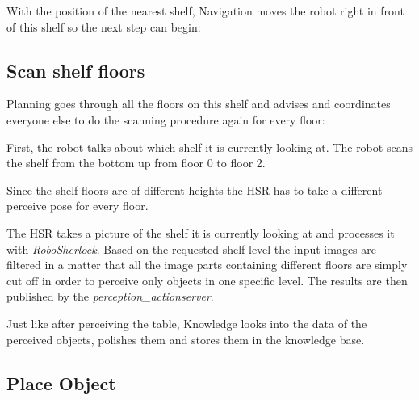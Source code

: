\documentclass[main.tex]{subfiles}
\begin{document}
	\begin{navigation}
	With the position of the nearest shelf, Navigation moves the robot right in front of this shelf so the next step can begin:
	\end{navigation}
	
	\subsection{Scan shelf floors}
	
	\begin{planning}
	Planning goes through all the floors on this shelf and advises and coordinates everyone else to do the scanning procedure again for every floor:
	\end{planning}
	\begin{nlp}
	First, the robot talks about which shelf it is currently looking at. The robot scans the shelf from the bottom up from floor 0 to floor 2.\end{nlp}
	
	\begin{manipulation}
	Since the shelf floors are of different heights the HSR has to take a different perceive pose for every floor.
	\end{manipulation}
	
	\begin{perception}
	The HSR takes a picture of the shelf it is currently looking at and processes it with \textit{RoboSherlock}. Based on the requested shelf level the input images are filtered in a matter that all the image parts containing different floors are simply cut off in order to perceive only objects in one specific level. The results are then published by the \textit{perception\_actionserver}.
	\end{perception}
	
	\begin{knowledge}
	Just like after perceiving the table, Knowledge looks into the data of the perceived objects, polishes them and stores them in the knowledge base.
	\end{knowledge}
	
	\subsection{Place Object}
	
\end{document}
